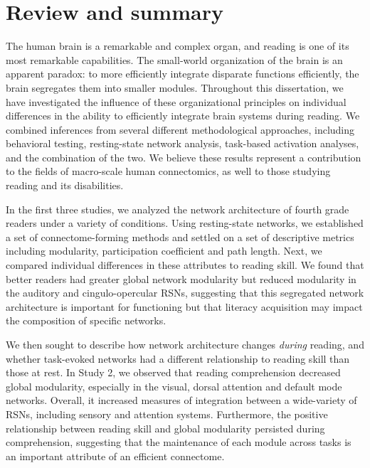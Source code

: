 \chapter{Review and summary}

The human brain is a remarkable and complex organ, and reading is one of its most remarkable capabilities. The small-world organization of the brain is an apparent paradox: to more efficiently integrate disparate functions efficiently, the brain segregates them into smaller modules. Throughout this dissertation, we have investigated the influence of these organizational principles on individual differences in the ability to efficiently integrate brain systems during reading. We combined inferences from several different methodological approaches, including behavioral testing, resting-state network analysis, task-based activation analyses, and the combination of the two. We believe these results represent a contribution to the fields of macro-scale human connectomics, as well to those studying reading and its disabilities.

In the first three studies, we analyzed the network architecture of fourth grade readers under a variety of conditions. Using resting-state networks, we established a set of connectome-forming methods and settled on a set of descriptive metrics including modularity, participation coefficient and path length. Next, we compared individual differences in these attributes to reading skill. We found that better readers had greater global network modularity but reduced modularity in the auditory and cingulo-opercular RSNs, suggesting that this segregated network architecture is important for functioning but that literacy acquisition may impact the composition of specific networks. 

We then sought to describe how network architecture changes \textit{during} reading, and whether task-evoked networks had a different relationship to reading skill than those at rest. In Study 2, we observed that reading comprehension decreased global modularity, especially in the visual, dorsal attention and default mode networks. Overall, it increased measures of integration between a wide-variety of RSNs, including sensory and attention systems. Furthermore, the positive relationship between reading skill and global modularity persisted during comprehension, suggesting that the maintenance of each module across tasks is an important attribute of an efficient connectome. 

